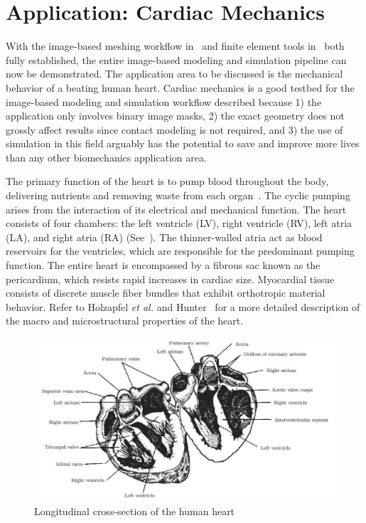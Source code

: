 \chapter{Application: Cardiac Mechanics}
\label{chap:5}
%
With the image-based meshing workflow in~ and finite element tools in~ both fully established, the entire image-based modeling and simulation pipeline can now be demonstrated. The application area to be discussed is the mechanical behavior of a beating human heart. Cardiac mechanics is a good testbed for the image-based modeling and simulation workflow described because 1) the application only involves binary image masks, 2) the exact geometry does not grossly affect results since contact modeling is not required, and 3) the use of simulation in this field arguably has the potential to save and improve more lives than any other biomechanics application area.

The primary function of the heart is to pump blood throughout the body, delivering nutrients and removing waste from each organ~\cite{holzapfel_2009}. The cyclic pumping arises from the interaction of its electrical and mechanical function. The heart consists of four chambers: the left ventricle (LV), right ventricle (RV), left atria (LA), and right atria (RA) (See~). The thinner-walled atria act as blood reservoirs for the ventricles, which are responsible for the predominant pumping function. The entire heart is encompassed by a fibrous sac known as the pericardium, which resists rapid increases in cardiac size. Myocardial tissue consists of discrete muscle fiber bundles that exhibit orthotropic material behavior. Refer to Holzapfel \textit{et al.} and Hunter~\cite{schmid} for a more detailed description of the macro and microstructural properties of the heart.

\begin{figure}[htbp!]
\centering
\includegraphics[width=1.0\textwidth]{media/anatomy.png}
\caption{Longitudinal cross-section of the human heart~\cite{katz_2015}}
\label{fig:anatomy}
\end{figure}


